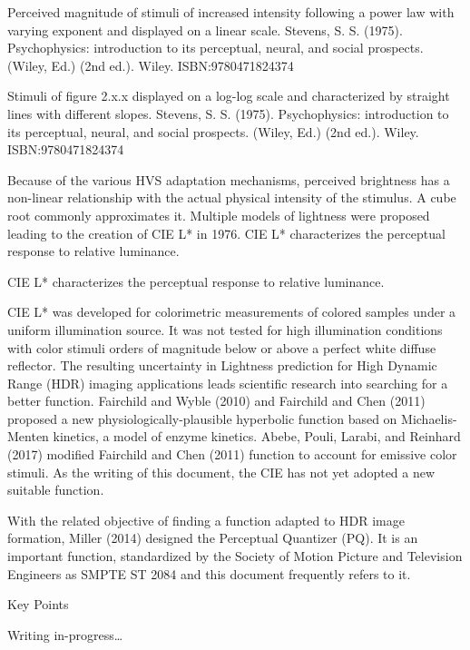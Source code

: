 Perceived magnitude of stimuli of increased intensity following a power law with varying exponent and displayed on a linear scale. Stevens, S. S. (1975). Psychophysics: introduction to its perceptual, neural, and social prospects. (Wiley, Ed.) (2nd ed.). Wiley. ISBN:9780471824374

Stimuli of figure 2.x.x displayed on a log-log scale and characterized by straight lines with different slopes. Stevens, S. S. (1975). Psychophysics: introduction to its perceptual, neural, and social prospects. (Wiley, Ed.) (2nd ed.). Wiley. ISBN:9780471824374

Because of the various HVS adaptation mechanisms, perceived brightness has a non-linear relationship with the actual physical intensity of the stimulus. A cube root commonly approximates it. Multiple models of lightness were proposed leading to the creation of CIE L* in 1976. CIE L* characterizes the perceptual response to relative luminance.


CIE L* characterizes the perceptual response to relative luminance.

CIE L* was developed for colorimetric measurements of colored samples under a uniform illumination source. It was not tested for high illumination conditions with color stimuli orders of magnitude below or above a perfect white diffuse reflector. The resulting uncertainty in Lightness prediction for High Dynamic Range (HDR) imaging applications leads scientific research into searching for a better function. Fairchild and Wyble (2010) and Fairchild and Chen (2011) proposed a new physiologically-plausible hyperbolic function based on Michaelis-Menten kinetics, a model of enzyme kinetics. Abebe, Pouli, Larabi, and Reinhard (2017) modified Fairchild and Chen (2011) function to account for emissive color stimuli. As the writing of this document, the CIE has not yet adopted a new suitable function.

With the related objective of finding a function adapted to HDR image formation, Miller (2014) designed the Perceptual Quantizer (PQ). It is an important function, standardized by the Society of Motion Picture and Television Engineers as SMPTE ST 2084 and this document frequently refers to it.

Key Points

Writing in-progress…


